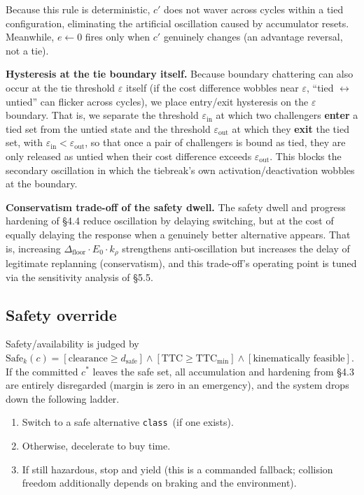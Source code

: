 \documentclass[11pt]{article}
\newcommand{\Class}{\texttt{class}}
\newcommand{\Dfloor}{\Delta_{\text{floor}}}
\begin{document}
Because this rule is deterministic, $c'$ does not waver across cycles within a tied configuration, eliminating the artificial oscillation caused by accumulator resets. Meanwhile, $e \leftarrow 0$ fires only when $c'$ genuinely changes (an advantage reversal, not a tie).

\textbf{Hysteresis at the tie boundary itself.} Because boundary chattering can also occur at the tie threshold $\varepsilon$ itself (if the cost difference wobbles near $\varepsilon$, ``tied $\leftrightarrow$ untied'' can flicker across cycles), we place entry/exit hysteresis on the $\varepsilon$ boundary. That is, we separate the threshold $\varepsilon_{\text{in}}$ at which two challengers \textbf{enter} a tied set from the untied state and the threshold $\varepsilon_{\text{out}}$ at which they \textbf{exit} the tied set, with $\varepsilon_{\text{in}} < \varepsilon_{\text{out}}$, so that once a pair of challengers is bound as tied, they are only released as untied when their cost difference exceeds $\varepsilon_{\text{out}}$. This blocks the secondary oscillation in which the tiebreak's own activation/deactivation wobbles at the boundary.

\textbf{Conservatism trade-off of the safety dwell.} The safety dwell and progress hardening of \S4.4 reduce oscillation by delaying switching, but at the cost of equally delaying the response when a genuinely better alternative appears. That is, increasing $\Dfloor \cdot E_0 \cdot k_\rho$ strengthens anti-oscillation but increases the delay of legitimate replanning (conservatism), and this trade-off's operating point is tuned via the sensitivity analysis of \S5.5.

\FloatBarrier
\subsection{Safety override}

Safety/availability is judged by $\mathrm{Safe}_k(c) = [\text{clearance} \ge d_{\text{safe}}] \wedge [\text{TTC} \ge \text{TTC}_{\min}] \wedge [\text{kinematically feasible}]$. If the committed $c^*$ leaves the safe set, all accumulation and hardening from \S4.3 are entirely disregarded (margin is zero in an emergency), and the system drops down the following ladder.

\begin{enumerate}
\item Switch to a safe alternative \Class\ (if one exists).
\item Otherwise, decelerate to buy time.
\item If still hazardous, stop and yield (this is a commanded fallback; collision freedom additionally depends on braking and the environment).
\end{enumerate}
\end{document}
